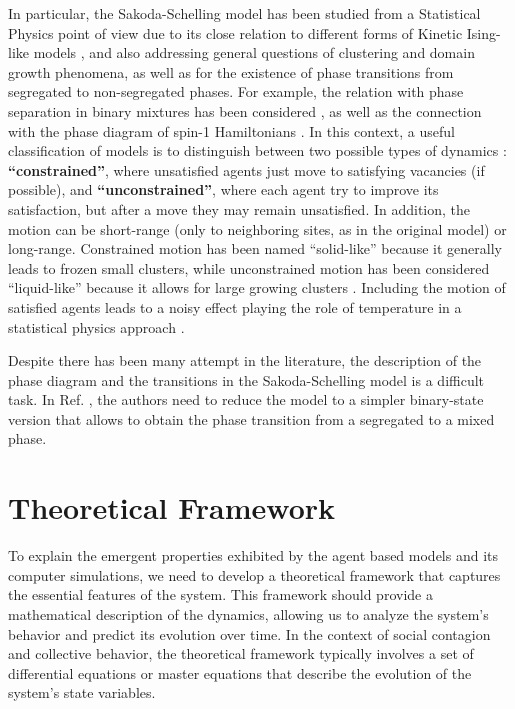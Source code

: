 In particular, the Sakoda-Schelling model has been studied from a Statistical Physics point of view due to its close relation to different forms of Kinetic Ising-like models \cite{stauffer-2007,stauffer-2013}, and also addressing general questions of clustering and domain growth phenomena, as well as for the existence of phase transitions from segregated to non-segregated phases. For example, the relation with phase separation in binary mixtures has been considered \cite{Dall_Asta_2008,Vinkovic}, as well as the connection with the phase diagram of spin-1 Hamiltonians \cite{BEG,BlumeCapel,Gauvin_2009,Gauvin_2010}. In this context, a useful classification of models is to distinguish between two possible types of dynamics \cite{Dall_Asta_2008}: \textbf{``constrained''}, where unsatisfied agents just move to satisfying vacancies (if possible), and \textbf{``unconstrained''},  where each agent try to improve its satisfaction, but after a move they may remain unsatisfied. In addition, the motion can be short-range (only to neighboring sites, as in the original model) or long-range. Constrained motion has been named ``solid-like'' because it generally leads to frozen small clusters, while unconstrained motion has been considered ``liquid-like'' because it allows for large growing clusters \cite{Vinkovic}. Including the motion of satisfied agents leads to a noisy effect playing the role of temperature in a statistical physics approach \cite{Gauvin_2009,Gauvin_2010}.

Despite there has been many attempt in the literature, the description of the phase diagram and the transitions in the Sakoda-Schelling model is a difficult task. In Ref. \cite{lucquiaud2022modeliser}, the authors need to reduce the model to a simpler binary-state version that allows to obtain the phase transition from a segregated to a mixed phase.

\section{\label{sec:Theoretical Framework} Theoretical Framework}

To explain the emergent properties exhibited by the agent based models and its computer simulations, we need to develop a theoretical framework that captures the essential features of the system. This framework should provide a mathematical description of the dynamics, allowing us to analyze the system's behavior and predict its evolution over time. In the context of social contagion and collective behavior, the theoretical framework typically involves a set of differential equations or master equations that describe the evolution of the system's state variables.

